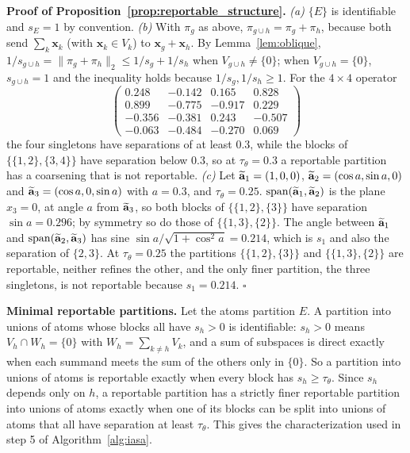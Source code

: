 \noindent\textbf{Proof of Proposition~\ref{prop:reportable_structure}.}
\emph{(a)}  \(\{E\}\) is identifiable and \(s_E=1\) by convention.
\emph{(b)}  With \(\pi_g\) as above, \(\pi_{g\cup h}=\pi_g+\pi_h\), because both send
\(\sum_k\mathbf x_k\) (with \(\mathbf x_k\in V_k\)) to \(\mathbf x_g+\mathbf x_h\).  By
Lemma~\ref{lem:oblique},
\(1/s_{g\cup h}=\|\pi_g+\pi_h\|_2\le1/s_g+1/s_h\) when \(V_{g\cup h}\ne\{0\}\); when
\(V_{g\cup h}=\{0\}\), \(s_{g\cup h}=1\) and the inequality holds because
\(1/s_g,1/s_h\ge1\).  For the \(4\times4\) operator
\[
\begin{pmatrix}
0.248&-0.142&0.165&0.828\\
0.899&-0.775&-0.917&0.229\\
-0.356&-0.381&0.243&-0.507\\
-0.063&-0.484&-0.270&0.069
\end{pmatrix}
\]
the four singletons have separations of at least \(0.3\), while the blocks of
\(\{\{1,2\},\{3,4\}\}\) have separation below \(0.3\), so at \(\tau_\theta=0.3\) a
reportable partition has a coarsening that is not reportable.
\emph{(c)}  Let \(\widetilde{\mathbf a}_1=(1,0,0)\), \(\widetilde{\mathbf a}_2=(\cos a,\sin a,0)\) and
\(\widetilde{\mathbf a}_3=(\cos a,0,\sin a)\) with \(a=0.3\), and \(\tau_\theta=0.25\).
\(\operatorname{span}(\widetilde{\mathbf a}_1,\widetilde{\mathbf a}_2)\) is the plane \(x_3=0\), at angle
\(a\) from \(\widetilde{\mathbf a}_3\), so both blocks of \(\{\{1,2\},\{3\}\}\) have separation
\(\sin a=0.296\); by symmetry so do those of \(\{\{1,3\},\{2\}\}\).  The angle
between \(\widetilde{\mathbf a}_1\) and \(\operatorname{span}(\widetilde{\mathbf a}_2,\widetilde{\mathbf a}_3)\) has sine
\(\sin a/\sqrt{1+\cos^2a}=0.214\), which is \(s_1\) and also the separation of
\(\{2,3\}\).  At \(\tau_\theta=0.25\) the partitions \(\{\{1,2\},\{3\}\}\) and
\(\{\{1,3\},\{2\}\}\) are reportable, neither refines the other, and the only finer
partition, the three singletons, is not reportable because \(s_1=0.214\).  \(\square\)

\noindent\textbf{Minimal reportable partitions.}  Let the atoms partition \(E\).  A
partition into unions of atoms whose blocks all have \(s_h>0\) is identifiable: \(s_h>0\)
means \(V_h\cap W_h=\{0\}\) with \(W_h=\sum_{k\ne h}V_k\), and a sum of subspaces is direct
exactly when each summand meets the sum of the others only in \(\{0\}\).  So a partition
into unions of atoms is reportable exactly when every block has \(s_h\ge\tau_\theta\).
Since \(s_h\) depends only on \(h\), a reportable partition has a strictly finer reportable
partition into unions of atoms exactly when one of its blocks can be split into unions
of atoms that all have separation at least \(\tau_\theta\).  This gives the
characterization used in step 5 of Algorithm~\ref{alg:iasa}.

